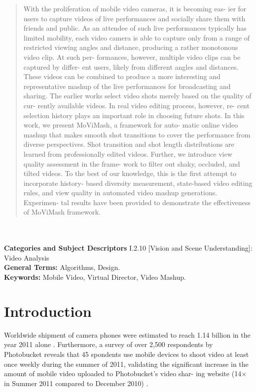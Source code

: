 \documentclass{sig-alternate}
\begin{document}
\maketitle
\begin{abstract}
With the proliferation of mobile video cameras, it is becoming eas-
ier for users to capture videos of live performances and socially
share them with friends and public. As an attendee of such live
performances typically has limited mobility, each video camera is
able to capture only from a range of restricted viewing angles and
distance, producing a rather monotonous video clip. At such per-
formances, however, multiple video clips can be captured by differ-
ent users, likely from different angles and distances. These videos
can be combined to produce a more interesting and representative
mashup of the live performances for broadcasting and sharing. The
earlier works select video shots merely based on the quality of cur-
rently available videos. In real video editing process, however, re-
cent selection history plays an important role in choosing future
shots. In this work, we present MoViMash, a framework for auto-
matic online video mashup that makes smooth shot transitions to
cover the performance from diverse perspectives. Shot transition
and shot length distributions are learned from professionally edited
videos. Further, we introduce view quality assessment in the frame-
work to filter out shaky, occluded, and tilted videos. To the best
of our knowledge, this is the first attempt to incorporate history-
based diversity measurement, state-based video editing rules, and
view quality in automated video mashup generations. Experimen-
tal results have been provided to demonstrate the effectiveness of
MoViMash framework.
\end{abstract}\\\\
\textbf{Categories and Subject Descriptors}
I.2.10 [Vision and Scene Understanding]: Video Analysis\\
\textbf{General Terms:} Algorithms, Design.\\
\textbf{Keywords: }Mobile Video, Virtual Director, Video Mashup.
\section{Introduction}
Worldwide shipment of camera phones were estimated to reach
1.14 billion in the year 2011 alone \cite{1}. Furthermore, a survey of
over 2,500 respondents by Photobucket reveals that 45%
spondents use mobile devices to shoot video at least once weekly during the summer of 2011, validating the significant increase in
the amount of mobile video uploaded to Photobucket’s video shar-
ing website (14× in Summer 2011 compared to December 2010) \cite{2}.
\end{document}
